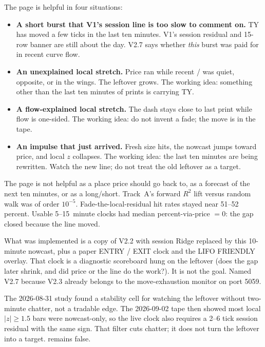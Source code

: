 \documentclass[11pt]{article}
\newcommand{\code}[1]{\texttt{\detokenize{#1}}}
\newcommand{\abs}[1]{\lvert #1 \rvert}
\begin{document}
The page is helpful in four situations:

\begin{itemize}
    \item \textbf{A short burst that V1's session line is too slow
    to comment on.}  TY has moved a few ticks in the last ten
    minutes.  V1's session residual and 15-row banner are still
    about the day.  V2.7 says whether \emph{this} burst was paid
    for in recent curve flow.
    \item \textbf{An unexplained local stretch.}  Price ran while
    recent \code{agg_1m}/\code{agg_5m} was quiet, opposite, or in
    the wings.  The leftover grows.  The working idea: something
    other than the last ten minutes of prints is carrying TY.
    \item \textbf{A flow-explained local stretch.}  The dash stays
    close to last print while flow is one-sided.  The working idea:
    do not invent a fade; the move is in the tape.
    \item \textbf{An impulse that just arrived.}  Fresh size hits,
    the nowcast jumps toward price, and local \(z\) collapses.
    The working idea: the last ten minutes are being rewritten.
    Watch the new line; do not treat the old leftover as a target.
\end{itemize}

The page is not helpful as a place price should go back to, as a
forecast of the next ten minutes, or as a long/short.  Track~A's
forward \(R^2\) lift versus random walk was of order \(10^{-5}\).
Fade-the-local-residual hit rates stayed near 51--52 percent.
Usable 5--15~minute clocks had median percent-via-price \(=0\):
the gap closed because the line moved.

What was implemented is a copy of V2.2 with session Ridge replaced
by this 10-minute nowcast, plus a paper ENTRY / EXIT clock and the
LIFO FRIENDLY overlay.  That clock is a diagnostic scoreboard hung
on the leftover (does the gap later shrink, and did price or the
line do the work?).  It is not the goal.  Named V2.7 because V2.3
already belongs to the move-exhaustion monitor on port 5059.

The 2026-08-31 study found a stability cell for watching the
leftover without two-minute chatter, not a tradable edge.  The
2026-09-02 tape then showed most local \(\abs{z}\ge 1.5\) bars were
nowcast-only, so the live clock also requires a 2--6 tick session
residual with the same sign.  That filter cuts chatter; it does not
turn the leftover into a target.  \code{ship_gate} remains false.
\end{document}
